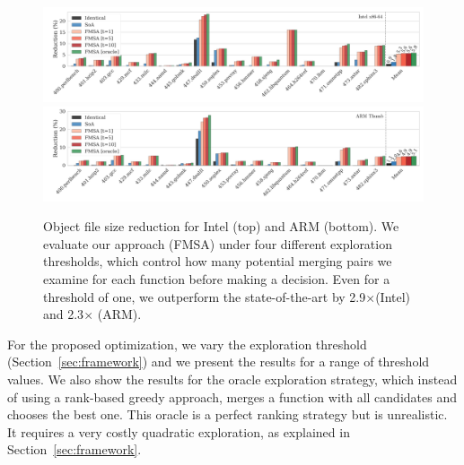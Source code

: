 \begin{figure}[t!]
  \centering
  \includegraphics[width=\linewidth]{figs/reduction-obj-intel-label.pdf} \\
  \vspace{-1.8ex}
  \includegraphics[width=\linewidth]{figs/reduction-obj-arm-label.pdf}
  \vspace{-4ex}
	\caption{Object file size reduction for Intel (top) and ARM (bottom). We evaluate our approach (FMSA) under four different exploration thresholds, which
      control how many potential merging pairs we examine for each function before making a decision. Even for a threshold of one, we outperform the state-of-the-art
	  by 2.9$\times$(Intel) and 2.3$\times$ (ARM).}
  \label{fig:reduction-obj}
\end{figure}

For the proposed optimization, we vary the exploration threshold (Section~\ref{sec:framework})
and we present the results for a range of threshold values. We also show the results for the oracle exploration strategy, which
instead of using a rank-based greedy approach, merges a function with all candidates and chooses the best one.
This oracle is a perfect ranking strategy but is unrealistic. It requires a very costly quadratic exploration, as explained in
Section~\ref{sec:framework}. 



